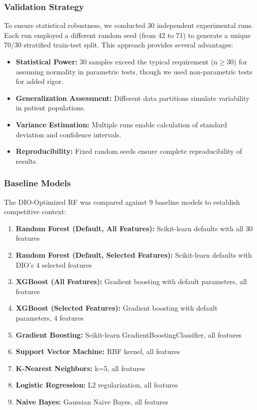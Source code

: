 \documentclass[12pt, a4paper]{article}
\begin{document}
\subsubsection{Validation Strategy}
To ensure statistical robustness, we conducted 30 independent experimental runs. Each run employed a different random seed (from 42 to 71) to generate a unique 70/30 stratified train-test split. This approach provides several advantages:
\begin{itemize}
    \item \textbf{Statistical Power:} 30 samples exceed the typical requirement (n$\geq$30) for assuming normality in parametric tests, though we used non-parametric tests for added rigor.
    \item \textbf{Generalization Assessment:} Different data partitions simulate variability in patient populations.
    \item \textbf{Variance Estimation:} Multiple runs enable calculation of standard deviation and confidence intervals.
    \item \textbf{Reproducibility:} Fixed random seeds ensure complete reproducibility of results.
\end{itemize}

\subsubsection{Baseline Models}
The DIO-Optimized RF was compared against 9 baseline models to establish competitive context:
\begin{enumerate}
    \item \textbf{Random Forest (Default, All Features):} Scikit-learn defaults with all 30 features
    \item \textbf{Random Forest (Default, Selected Features):} Scikit-learn defaults with DIO's 4 selected features
    \item \textbf{XGBoost (All Features):} Gradient boosting with default parameters, all features
    \item \textbf{XGBoost (Selected Features):} Gradient boosting with default parameters, 4 features
    \item \textbf{Gradient Boosting:} Scikit-learn GradientBoostingClassifier, all features
    \item \textbf{Support Vector Machine:} RBF kernel, all features
    \item \textbf{K-Nearest Neighbors:} k=5, all features
    \item \textbf{Logistic Regression:} L2 regularization, all features
    \item \textbf{Naive Bayes:} Gaussian Naive Bayes, all features
\end{enumerate}
\end{document}
